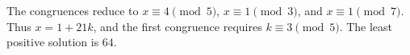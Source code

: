 The congruences reduce to $x\equiv4\pmod5$, $x\equiv1\pmod3$, and $x\equiv1\pmod7$. Thus $x=1+21k$, and the first congruence requires $k\equiv3\pmod5$. The least positive solution is $\boxed{64}$.

